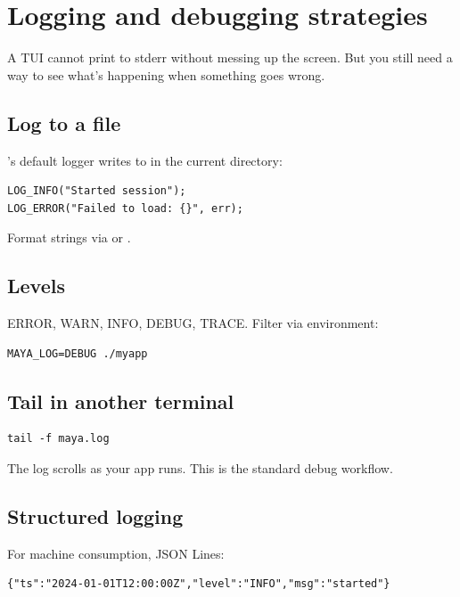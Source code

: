 \chapter{Logging and debugging strategies}
\label{ch:logging}

\begin{aside}
A TUI cannot print to stderr without messing up the screen.
But you still need a way to see what's happening when
something goes wrong.
\end{aside}

\section{Log to a file}

\maya{}'s default logger writes to  in the
current directory:

\begin{lstlisting}
LOG_INFO("Started session");
LOG_ERROR("Failed to load: {}", err);
\end{lstlisting}

Format strings via  or
.

\section{Levels}

ERROR, WARN, INFO, DEBUG, TRACE. Filter via environment:

\begin{lstlisting}
MAYA_LOG=DEBUG ./myapp
\end{lstlisting}

\section{Tail in another terminal}

\begin{lstlisting}
tail -f maya.log
\end{lstlisting}

The log scrolls as your app runs. This is the standard
debug workflow.

\section{Structured logging}

For machine consumption, JSON Lines:

\begin{lstlisting}
{"ts":"2024-01-01T12:00:00Z","level":"INFO","msg":"started"}
\end{lstlisting}

